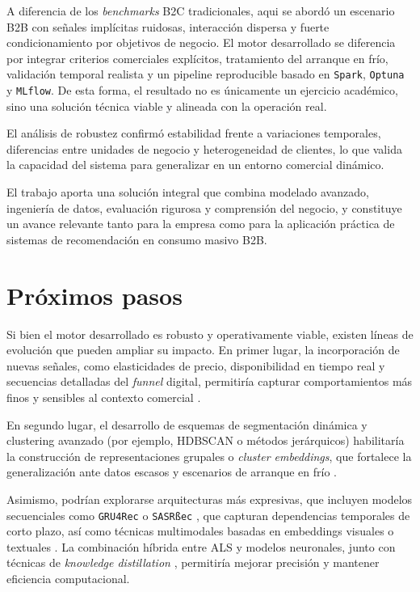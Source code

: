 A diferencia de los \textit{benchmarks} B2C tradicionales, aqui se abordó un escenario B2B con señales implícitas ruidosas, interacción dispersa y fuerte condicionamiento por objetivos de negocio. El motor desarrollado se diferencia por integrar criterios comerciales explícitos, tratamiento del arranque en frío, validación temporal realista y un pipeline reproducible basado en \texttt{Spark}, \texttt{Optuna} y \texttt{MLflow}. De esta forma, el resultado no es únicamente un ejercicio académico, sino una solución técnica viable y alineada con la operación real.

El análisis de robustez confirmó estabilidad frente a variaciones temporales, diferencias entre unidades de negocio y heterogeneidad de clientes, lo que valida la capacidad del sistema para generalizar en un entorno comercial dinámico.

El trabajo aporta una solución integral que combina modelado avanzado, ingeniería de datos, evaluación rigurosa y comprensión del negocio, y constituye un avance relevante tanto para la empresa como para la aplicación práctica de sistemas de recomendación en consumo masivo B2B.

\section{Próximos pasos}

Si bien el motor desarrollado es robusto y operativamente viable, existen líneas de evolución que pueden ampliar su impacto. En primer lugar, la incorporación de nuevas señales, como elasticidades de precio, disponibilidad en tiempo real y secuencias detalladas del \textit{funnel} digital, permitiría capturar comportamientos más finos y sensibles al contexto comercial \cite{ARTICLE:Elgendy2021, ARTICLE:Gupta2019, ARTICLE:Zhang2019}.

En segundo lugar, el desarrollo de esquemas de segmentación dinámica y clustering avanzado (por ejemplo, HDBSCAN o métodos jerárquicos) habilitaría la construcción de representaciones grupales o \textit{cluster embeddings}, que fortalece la generalización ante datos escasos y escenarios de arranque en frío \cite{ARTICLE:McInnes2017, ARTICLE:Zhang2017segmentation, ARTICLE:Sarwar2002}.

Asimismo, podrían explorarse arquitecturas más expresivas, que incluyen modelos secuenciales como \texttt{GRU4Rec} o \texttt{SASRßec} \cite{ARTICLE:Hidasi2016, ARTICLE:Kang2018}, que capturan dependencias temporales de corto plazo, así como técnicas multimodales basadas en embeddings visuales o textuales \cite{ARTICLE:Mikolov2013, ARTICLE:Grbovic2018}. La combinación híbrida entre ALS y modelos neuronales, junto con técnicas de \textit{knowledge distillation} \cite{ARTICLE:Tang2018, ARTICLE:Hinton2015}, permitiría mejorar precisión y mantener eficiencia computacional.

